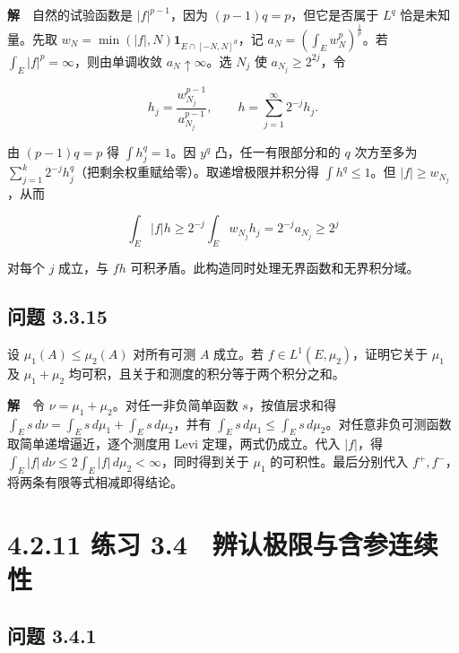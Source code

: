 \documentclass[11pt,a4paper]{article}
\begin{document}
\textbf{解}　自然的试验函数是 \(|f|^{p-1}\)，因为
\((p-1)q=p\)，但它是否属于 \(L^q\) 恰是未知量。先取
\(w_N=\min(|f|,N)\mathbf1_{E\cap[-N,N]^d}\)，记
\(a_N=(\int_E w_N^p)^{\frac{1}{p}}\)。若
\(\int_E|f|^p=\infty\)，则由单调收敛 \(a_N\uparrow\infty\)。选 \(N_j\)
使 \(a_{N_j}\ge 2^{2j}\)，令

\begin{equation*}
h_j=\frac{w_{N_j}^{p-1}}{a_{N_j}^{p-1}},\qquad h=\sum_{j=1}^\infty 2^{-j}h_j .
\end{equation*}

由 \((p-1)q=p\) 得 \(\int h_j^q=1\)。因 \(y^q\) 凸，任一有限部分和的
\(q\) 次方至多为
\(\sum_{j=1}^k2^{-j}h_j^q\)（把剩余权重赋给零）。取递增极限并积分得
\(\int h^q\le1\)。但 \(|f|\ge w_{N_j}\)，从而

\begin{equation*}
\int_E |f|h\ge 2^{-j}\int_E w_{N_j}h_j=2^{-j}a_{N_j}\ge 2^j
\end{equation*}

对每个 \(j\) 成立，与 \(fh\)
可积矛盾。此构造同时处理无界函数和无界积分域。

\subsection{问题 3.3.15}\label{ux95eeux9898-3.3.15}

设 \(\mu_1(A)\le\mu_2(A)\) 对所有可测 \(A\) 成立。若
\(f\in L^1(E,\mu_2)\)，证明它关于 \(\mu_1\) 及 \(\mu_1+\mu_2\)
均可积，且关于和测度的积分等于两个积分之和。

\textbf{解}　令 \(\nu=\mu_1+\mu_2\)。对任一非负简单函数
\(s\)，按值层求和得
\(\int_E s\,d\nu=\int_E s\,d\mu_1+\int_E s\,d\mu_2\)，并有
\(\int_E s\,d\mu_1\le\int_E s\,d\mu_2\)。对任意非负可测函数取简单递增逼近，逐个测度用
Levi 定理，两式仍成立。代入 \(|f|\)，得
\(\int_E |f|\,d\nu\le2\int_E |f|\,d\mu_2<\infty\)，同时得到关于
\(\mu_1\) 的可积性。最后分别代入
\(f^+,f^-\)，将两条有限等式相减即得结论。

\clearpage\section[\S{}4.2.11 练习
3.4　辨认极限与含参连续性]{4.2.11 练习
3.4　辨认极限与含参连续性}\label{ux7ec3ux4e60-3.4-ux8fa8ux8ba4ux6781ux9650ux4e0eux542bux53c2ux8fdeux7eedux6027}

\subsection{问题 3.4.1}\label{ux95eeux9898-3.4.1}
\end{document}
